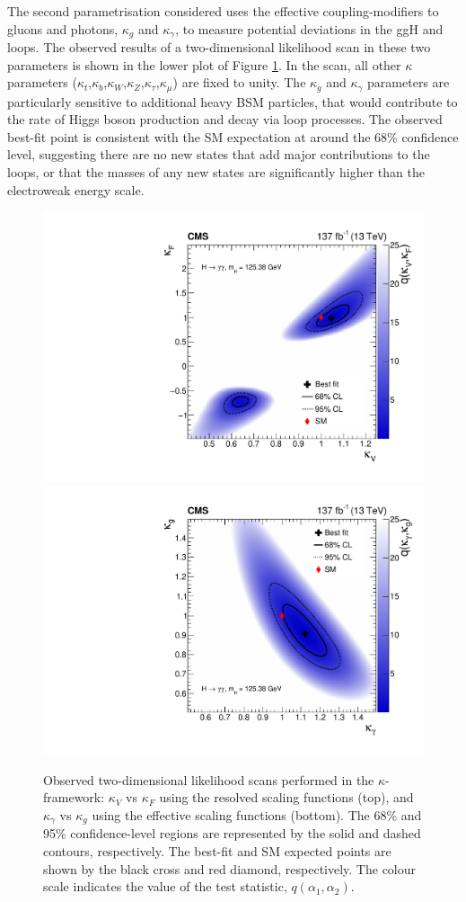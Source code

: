 The second parametrisation considered uses the effective coupling-modifiers to gluons and photons, $\kappa_g$ and $\kappa_\gamma$, to measure potential deviations in the ggH and \Hgg loops. The observed results of a two-dimensional likelihood scan in these two parameters is shown in the lower plot of Figure \ref{fig:2d_kappa}. In the scan, all other $\kappa$ parameters ($\kappa_t$,$\kappa_b$,$\kappa_W$,$\kappa_Z$,$\kappa_\tau$,$\kappa_\mu$) are fixed to unity. The $\kappa_g$ and $\kappa_\gamma$ parameters are particularly sensitive to additional heavy BSM particles, that would contribute to the rate of Higgs boson production and decay via loop processes. The observed best-fit point is consistent with the SM expectation at around the 68\% confidence level, suggesting there are no new states that add major contributions to the loops, or that the masses of any new states are significantly higher than the electroweak energy scale.

\begin{figure}
  \centering
  \includegraphics[width=.65\textwidth]{Figures/hgg_results/scan2D_kappa_V_vs_kappa_F_obs.pdf}
  \includegraphics[width=.65\textwidth]{Figures/hgg_results/scan2D_kappa_gam_vs_kappa_g_obs.pdf}
  \caption[Two-dimensional likelihood scans in the coupling-modifier parametrisation]
  {
    Observed two-dimensional likelihood scans performed in the $\kappa$-framework: $\kappa_V$ vs $\kappa_F$ using the resolved scaling functions (top), and $\kappa_\gamma$ vs $\kappa_g$ using the effective scaling functions (bottom). The 68\% and 95\% confidence-level regions are represented by the solid and dashed contours, respectively. The best-fit and SM expected points are shown by the black cross and red diamond, respectively. The colour scale indicates the value of the test statistic, $q(\alpha_1,\alpha_2)$.
  }
  \label{fig:2d_kappa}
\end{figure}

